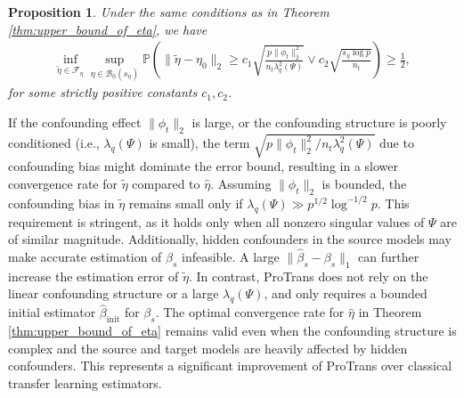 \documentclass[12pt]{article}
\newtheorem{prop}{Proposition}
\begin{document}
\begin{prop}
     \label{prop:lower_bound_of_baseline_eta_only}
     Under the same conditions as in Theorem \ref{thm:upper_bound_of_eta}, we have %
     \begin{align*}
       \inf_{\tilde{\eta}\in \mathcal{F}_\eta} \sup_{\eta \in \mathcal{B}_0(s_\eta)} \mathbb{P}\left(\|\tilde{\eta} - \eta_0\|_2 \ge c_1 \sqrt{\frac{p\|\phi_t\|_2^2}{n_t\lambda_q^2(\Psi)}} \vee c_2\sqrt{\frac{s_\eta\log p}{n_t}} \right)\ge \frac{1}{2},
     \end{align*}
     for some strictly positive constants $c_1,c_2$.
\end{prop}
 
If the confounding effect $\|\phi_t\|_2$ is large, or the confounding structure is poorly conditioned (i.e., $\lambda_q(\Psi)$ is small), the term $\sqrt{p\|\phi_t\|_2^2/n_t\lambda^2_q(\Psi)}$ due to confounding bias might dominate the error bound, resulting in a slower convergence rate for $\tilde{\eta}$ compared to $\hat{\eta}$. Assuming $\|\phi_t\|_2$ is bounded, the confounding bias in $\tilde{\eta}$ remains small only if $\lambda_q(\Psi)\gg p^{1/2}\log^{-1/2}p$. This requirement is stringent, as it holds only when all nonzero singular values of $\Psi$ are of similar magnitude. Additionally, hidden confounders in the source models may make accurate estimation of $\beta_s$ infeasible. A large $\|\hat{\beta}_s - \beta_s\|_1$ can further increase the estimation error of $\tilde{\eta}$. In contrast, ProTrans does not rely on the linear confounding structure or a large $\lambda_q(\Psi)$, and only requires a bounded initial estimator $\hat{\beta}_{\text{init}}$ for $\beta_s$. The optimal convergence rate for $\hat{\eta}$ in Theorem \ref{thm:upper_bound_of_eta} remains valid even when the confounding structure is complex and the source and target models are heavily affected by hidden confounders. This represents a significant improvement of ProTrans over classical transfer learning estimators.
\end{document}
